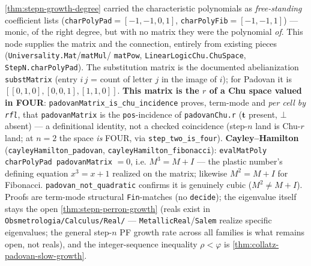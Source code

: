 \begin{theorem}\label{thm:stepn-chu-cayley-hamilton}\leanok{}
\cref{thm:stepn-growth-degree} carried the characteristic polynomials as \emph{free-standing}
coefficient lists (\texttt{charPolyPad}$=[-1,-1,0,1]$, \texttt{charPolyFib}$=[-1,-1,1]$) --- monic,
of the right degree, but with no matrix they were the polynomial \emph{of}. This node supplies the
matrix and the connection, entirely from existing pieces (\texttt{Universality.Mat}/\texttt{matMul}/
\texttt{matPow}, \texttt{LinearLogicChu.ChuSpace}, \texttt{StepN.charPolyPad}). The substitution
matrix is the documented abelianization \texttt{substMatrix} (entry $i\,j$ = count of letter $j$ in
the image of $i$); for Padovan it is $[[0,1,0],[0,0,1],[1,1,0]]$. \textbf{This matrix is the $r$ of
a Chu space valued in FOUR}: \texttt{padovanMatrix\_is\_chu\_incidence} proves, term-mode and
\emph{per cell by \texttt{rfl}}, that \texttt{padovanMatrix} is the \texttt{pos}-incidence of
\texttt{padovanChu.r} ($\mathbf t$ present, $\bot$ absent) --- a definitional identity, not a
checked coincidence (step-$n$ land is Chu-$r$ land; at $n=2$ the space \emph{is} FOUR, via
\texttt{step\_two\_is\_four}). \textbf{Cayley--Hamilton} (\texttt{cayleyHamilton\_padovan},
\texttt{cayleyHamilton\_fibonacci}): \texttt{evalMatPoly charPolyPad padovanMatrix} $=0$, i.e.
$M^3=M+I$ --- the plastic number's defining equation $x^3=x+1$ realized on the matrix; likewise
$M^2=M+I$ for Fibonacci. \texttt{padovan\_not\_quadratic} confirms it is genuinely cubic
($M^2\neq M+I$). Proofs are term-mode structural \texttt{Fin}-matches (no \texttt{decide}); the
eigenvalue itself stays the open \cref{thm:stepn-perron-growth} (reals exist in \texttt{Obsmetrologia/Calculus/Real/}
--- \texttt{MetallicReal}/\texttt{Salem} realize specific eigenvalues; the general step-$n$ PF growth
rate across all families is what remains open, not reals), and the
integer-sequence inequality $\rho<\varphi$ is \cref{thm:collatz-padovan-slow-growth}.
\end{theorem}

